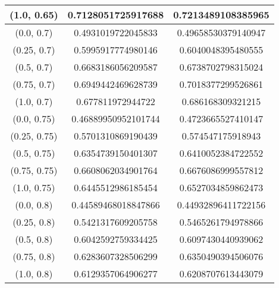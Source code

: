 \begin{table}[H]
\begin{tabular}{|c|c|c|}
\hline
(1.0, 0.65) & 0.7128051725917688 & 0.7213489108385965 \\
\hline
\hline
(0.0, 0.7) & 0.4931019722045833 & 0.49658530379140947 \\
\hline
(0.25, 0.7) & 0.5995917774980146 & 0.6040048395480555 \\
\hline
(0.5, 0.7) & 0.6683186056209587 & 0.6738702798315024 \\
\hline
(0.75, 0.7) & 0.6949442469628739 & 0.7018377299526861 \\
\hline
(1.0, 0.7) & 0.677811972944722 & 0.686168309321215 \\
\hline
\hline
(0.0, 0.75) & 0.46889950952101744 & 0.4723665527410147 \\
\hline
(0.25, 0.75) & 0.5701310869190439 & 0.574547175918943 \\
\hline
(0.5, 0.75) & 0.6354739150401307 & 0.6410052384722552 \\
\hline
(0.75, 0.75) & 0.6608062034901764 & 0.6676086999557812 \\
\hline
(1.0, 0.75) & 0.6445512986185454 & 0.6527034859862473 \\
\hline
\hline
(0.0, 0.8) & 0.44589468018847866 & 0.44932896411722156 \\
\hline
(0.25, 0.8) & 0.5421317609205758 & 0.5465261794978866 \\
\hline
(0.5, 0.8) & 0.6042592759334425 & 0.6097430440939062 \\
\hline
(0.75, 0.8) & 0.6283607328506299 & 0.6350490394506076 \\
\hline
(1.0, 0.8) & 0.6129357064906277 & 0.6208707613443079 \\
\hline
\end{tabular}
\end{table}
